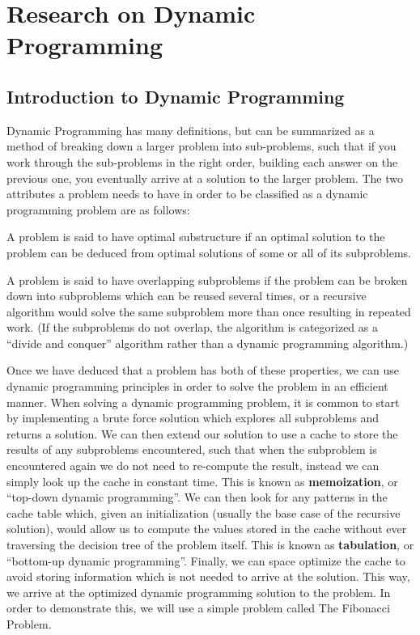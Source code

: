 \chapter{Research on Dynamic Programming}

\section{Introduction to Dynamic Programming}
Dynamic Programming has many definitions, but can be summarized as a method of breaking down a larger problem into sub-problems, such that if you work through the sub-problems in the right order, building each answer on the previous one, you eventually arrive at a solution to the larger problem.
The two attributes a problem needs to have in order to be classified as a dynamic programming problem are as follows:

\begin{definition}
    A problem is said to have optimal substructure if an optimal solution to the problem can be deduced from optimal solutions of some or all of its subproblems.
\end{definition}

\begin{definition}
    A problem is said to have overlapping subproblems if the problem can be broken down into subproblems which can be reused several times, or a recursive algorithm would solve the same subproblem more than once resulting in repeated work. (If the subproblems do not overlap, the algorithm is categorized as a ``divide and conquer'' algorithm rather than a dynamic programming algorithm.)
\end{definition} 
Once we have deduced that a problem has both of these properties, we can use dynamic programming principles in order to solve the problem in an efficient manner.
When solving a dynamic programming problem, it is common to start by implementing a brute force solution which explores all subproblems and returns a solution.
We can then extend our solution to use a cache to store the results of any subproblems encountered, such that when the subproblem is encountered again we do not need to re-compute the result, instead we can simply look up the cache in constant time.
This is known as \textbf{memoization}, or ``top-down dynamic programming''.
We can then look for any patterns in the cache table which, given an initialization (usually the base case of the recursive solution), would allow us to compute the values stored in the cache without ever traversing the decision tree of the problem itself.
This is known as \textbf{tabulation}, or ``bottom-up dynamic programming''.
Finally, we can space optimize the cache to avoid storing information which is not needed to arrive at the solution.
This way, we arrive at the optimized dynamic programming solution to the problem.
In order to demonstrate this, we will use a simple problem called The Fibonacci Problem.


